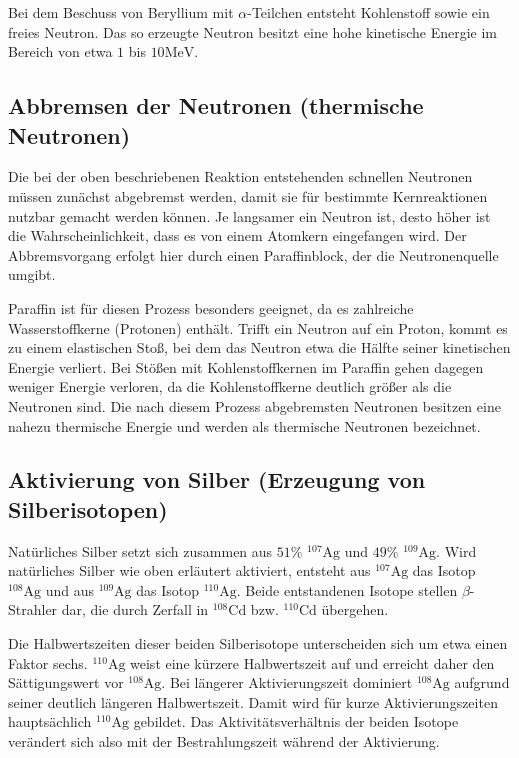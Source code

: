 Bei dem Beschuss von Beryllium mit $\alpha$-Teilchen entsteht Kohlenstoff sowie ein freies Neutron. Das so erzeugte Neutron besitzt eine hohe kinetische Energie im Bereich von etwa $1$ bis $10\mathrm{MeV}$.

\subsection{Abbremsen der Neutronen (thermische Neutronen)}

Die bei der oben beschriebenen Reaktion entstehenden schnellen Neutronen müssen zunächst abgebremst werden, damit sie für bestimmte Kernreaktionen nutzbar gemacht werden können. Je langsamer ein Neutron ist, desto höher ist die Wahrscheinlichkeit, dass es von einem Atomkern eingefangen wird. Der Abbremsvorgang erfolgt hier durch einen Paraffinblock, der die Neutronenquelle umgibt.

Paraffin ist für diesen Prozess besonders geeignet, da es zahlreiche Wasserstoffkerne (Protonen) enthält. Trifft ein Neutron auf ein Proton, kommt es zu einem elastischen Stoß, bei dem das Neutron etwa die Hälfte seiner kinetischen Energie verliert. Bei Stößen mit Kohlenstoffkernen im Paraffin gehen dagegen weniger Energie verloren, da die Kohlenstoffkerne deutlich größer als die Neutronen sind. Die nach diesem Prozess abgebremsten Neutronen besitzen eine nahezu thermische Energie und werden als thermische Neutronen bezeichnet.

\subsection{Aktivierung von Silber (Erzeugung von Silberisotopen)}

Natürliches Silber setzt sich zusammen aus $51\%$ $^{107}\mathrm{Ag}$ und $49\%$ $^{109}\mathrm{Ag}$. Wird natürliches Silber wie oben erläutert aktiviert, entsteht aus $^{107}\mathrm{Ag}$ das Isotop $^{108}\mathrm{Ag}$ und aus $^{109}\mathrm{Ag}$ das Isotop $^{110}\mathrm{Ag}$. Beide entstandenen Isotope stellen $\beta$-Strahler dar, die durch Zerfall in $^{108}\mathrm{Cd}$ bzw. $^{110}\mathrm{Cd}$ übergehen.

Die Halbwertszeiten dieser beiden Silberisotope unterscheiden sich um etwa einen Faktor sechs. $^{110}\mathrm{Ag}$ weist eine kürzere Halbwertszeit auf und erreicht daher den Sättigungswert vor $^{108}\mathrm{Ag}$. Bei längerer Aktivierungszeit dominiert $^{108}\mathrm{Ag}$ aufgrund seiner deutlich längeren Halbwertszeit. Damit wird für kurze Aktivierungszeiten hauptsächlich $^{110}\mathrm{Ag}$ gebildet. Das Aktivitätsverhältnis der beiden Isotope verändert sich also mit der Bestrahlungszeit während der Aktivierung.

